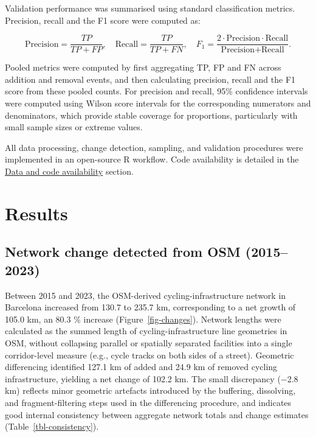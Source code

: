 \documentclass[
]{article}
\begin{document}
Validation performance was summarised using standard classification
metrics. Precision, recall and the F1 score were computed as:

\[\text{Precision}=\frac{TP}{TP+FP},\quad
\text{Recall}=\frac{TP}{TP+FN},\quad
F_1=\frac{2\cdot \text{Precision}\cdot \text{Recall}}{\text{Precision}+\text{Recall}}.\]

Pooled metrics were computed by first aggregating TP, FP and FN across
addition and removal events, and then calculating precision, recall and
the F1 score from these pooled counts. For precision and recall, 95\%
confidence intervals were computed using Wilson score intervals for the
corresponding numerators and denominators, which provide stable coverage
for proportions, particularly with small sample sizes or extreme values.

All data processing, change detection, sampling, and validation
procedures were implemented in an open-source R workflow. Code
availability is detailed in the \hyperref[s1-code]{Data and code
availability} section.

\section{Results}\label{results}

\subsection{Network change detected from OSM
(2015--2023)}\label{sec-network-change}

Between 2015 and 2023, the OSM-derived cycling-infrastructure network in
Barcelona increased from 130.7 to 235.7 km, corresponding to a net
growth of 105.0 km, an 80.3 \% increase (Figure~\ref{fig-changes}).
Network lengths were calculated as the summed length of
cycling-infrastructure line geometries in OSM, without collapsing
parallel or spatially separated facilities into a single corridor-level
measure (e.g., cycle tracks on both sides of a street). Geometric
differencing identified 127.1 km of added and 24.9 km of removed cycling
infrastructure, yielding a net change of 102.2 km. The small discrepancy
(−2.8 km) reflects minor geometric artefacts introduced by the
buffering, dissolving, and fragment-filtering steps used in the
differencing procedure, and indicates good internal consistency between
aggregate network totals and change estimates
(Table~\ref{tbl-consistency}).
\end{document}
